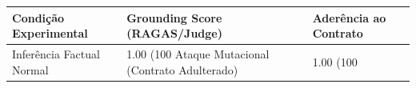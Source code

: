 \begin{tabular}{lll}
\toprule
Condição Experimental & Grounding Score (RAGAS/Judge) & Aderência ao Contrato \\
\midrule
Inferência Factual Normal & 1.00 (100%
Ataque Mutacional (Contrato Adulterado) & 1.00 (100%
\bottomrule
\end{tabular}
